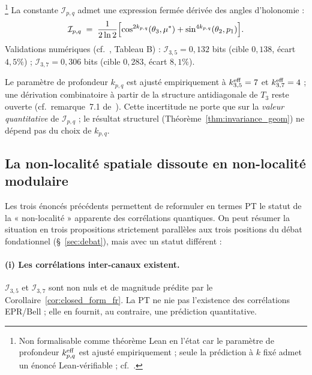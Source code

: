 \begin{corollaire}
\label{cor:closed_form_fr}
\footnote{Non formalisable comme théorème Lean en l'état car le
paramètre de profondeur $k_{p,q}^{\rm eff}$ est ajusté
empiriquement ; seule la prédiction à $k$ fixé admet un énoncé
Lean-vérifiable ;
cf.~\cite[\S~8.5]{PT_CRT_DECOUPLING}.}
La constante $\mathcal{I}_{p,q}$ admet une expression fermée
dérivée des angles d'holonomie :
\begin{equation}
  \mathcal{I}_{p,q}
  \;=\;
  \frac{1}{2 \ln 2}\Bigl[
    \cos^{2 k_{p,q}}(\theta_3, {\mu^{*}})
    + \sin^{4 k_{p,q}}(\theta_2, p_1)
  \Bigr].
  \label{eq:closed_form_fr}
\end{equation}
Validations numériques (cf.~\cite{PT_CRT_DECOUPLING}, Tableau B) :
$\mathcal{I}_{3,5} = 0{,}132$ bits (cible $0{,}138$, écart $4{,}5\%$) ;
$\mathcal{I}_{3,7} = 0{,}306$ bits (cible $0{,}283$, écart $8{,}1\%$).
\end{corollaire}

Le paramètre de profondeur $k_{p,q}$ est ajusté empiriquement à
$k_{3,5}^{\rm eff} = 7$ et $k_{3,7}^{\rm eff} = 4$ ; une dérivation
combinatoire à partir de la structure antidiagonale de $T_3$ reste
ouverte (cf.\ remarque~7.1 de~\cite{PT_CRT_DECOUPLING}). Cette
incertitude ne porte que sur la \emph{valeur quantitative} de
$\mathcal{I}_{p,q}$ ; le résultat structurel
(Théorème~\ref{thm:invariance_geom}) ne dépend pas du choix de
$k_{p,q}$.

\subsection{La non-localité spatiale dissoute en non-localité modulaire}
\label{ssec:dissolution}

Les trois énoncés précédents permettent de reformuler en termes
PT le statut de la « non-localité » apparente des corrélations
quantiques. On peut résumer la situation en trois propositions
strictement parallèles aux trois positions du débat fondationnel
(\S~\ref{sec:debat}), mais avec un statut différent :

\paragraph{(i) Les corrélations inter-canaux existent.}
$\mathcal{I}_{3,5}$ et $\mathcal{I}_{3,7}$ sont
non nuls et de magnitude prédite par le
Corollaire~\ref{cor:closed_form_fr}. La PT ne nie pas l'existence
des corrélations EPR/Bell ; elle en fournit, au contraire, une
prédiction quantitative.

